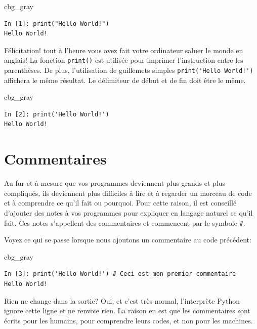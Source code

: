 \documentclass[%
oneside,                 %
final,                   %
10pt]{article}
\newenvironment{_cod_tight}[1]{
   \def\FrameCommand{\colorbox{#1}}
   \FrameRule0.6pt\MakeFramed {\FrameRestore}\vskip3mm}
   {\vskip0mm\endMakeFramed}
\newenvironment{cod}[1]{
\bgroup\rmfamily
\fboxsep=0mm\relax
\begin{_cod_tight}{#1}
\list{}{\parsep=-2mm\parskip=0mm\topsep=0pt\leftmargin=2mm
\rightmargin=2\leftmargin\leftmargin=4pt\relax}
\item\relax}
{\endlist\end{_cod_tight}\egroup}
\begin{document}
\begin{cod}{cbg_gray}\begin{verbatim}
In [1]: print("Hello World!")
Hello World!
\end{verbatim}
\end{cod}
\noindent

Félicitation! tout à l'heure vous avez fait votre ordinateur saluer le monde en anglais! La fonction \texttt{print()} est utilisée pour imprimer l’instruction entre les parenthèses. De plus, l'utilisation de guillemets simples \Verb?print('Hello World!')? affichera le même résultat. Le délimiteur de début et de fin doit être le même.

\begin{cod}{cbg_gray}\begin{verbatim}
In [2]: print('Hello World!')
Hello World!
\end{verbatim}
\end{cod}
\noindent

\section{Commentaires}

Au fur et à mesure que vos programmes deviennent plus grands et plus compliqués, ils deviennent plus difficiles à lire et à regarder un morceau de code et à comprendre ce qu'il fait ou pourquoi. Pour cette raison, il est conseillé d’ajouter des notes à vos programmes pour expliquer en langage naturel ce qu’il fait. Ces notes s'appellent des commentaires et commencent par le symbole \Verb!#!.

Voyez ce qui se passe lorsque nous ajoutons un commentaire au code précédent:

\begin{cod}{cbg_gray}\begin{verbatim}
In [3]: print('Hello World!') # Ceci est mon premier commentaire
Hello World!
\end{verbatim}
\end{cod}
\noindent
Rien ne change dans la sortie? Oui, et c’est très normal, l’interprète Python ignore cette ligne et ne renvoie rien. La raison en est que les commentaires sont écrits pour les humains, pour comprendre leurs codes, et non pour les machines.
\end{document}
